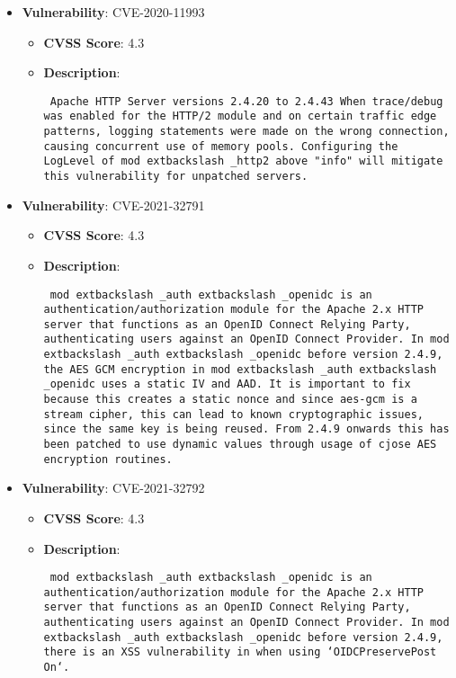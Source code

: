 \documentclass{article}
\begin{document}
\begin{itemize}
        \item \textbf{Vulnerability}: CVE-2020-11993
        \begin{itemize}
            \item \textbf{CVSS Score}:  4.3 
            \item \textbf{Description}: \parbox{\linewidth}{\texttt{ Apache HTTP Server versions 2.4.20 to 2.4.43 When trace/debug was enabled for the HTTP/2 module and on certain traffic edge patterns, logging statements were made on the wrong connection, causing concurrent use of memory pools. Configuring the LogLevel of mod	extbackslash _http2 above "info" will mitigate this vulnerability for unpatched servers. }}
        \end{itemize}
    
        \item \textbf{Vulnerability}: CVE-2021-32791
        \begin{itemize}
            \item \textbf{CVSS Score}:  4.3 
            \item \textbf{Description}: \parbox{\linewidth}{\texttt{ mod	extbackslash _auth	extbackslash _openidc is an authentication/authorization module for the Apache 2.x HTTP server that functions as an OpenID Connect Relying Party, authenticating users against an OpenID Connect Provider. In mod	extbackslash _auth	extbackslash _openidc before version 2.4.9, the AES GCM encryption in mod	extbackslash _auth	extbackslash _openidc uses a static IV and AAD. It is important to fix because this creates a static nonce and since aes-gcm is a stream cipher, this can lead to known cryptographic issues, since the same key is being reused. From 2.4.9 onwards this has been patched to use dynamic values through usage of cjose AES encryption routines. }}
        \end{itemize}
    
        \item \textbf{Vulnerability}: CVE-2021-32792
        \begin{itemize}
            \item \textbf{CVSS Score}:  4.3 
            \item \textbf{Description}: \parbox{\linewidth}{\texttt{ mod	extbackslash _auth	extbackslash _openidc is an authentication/authorization module for the Apache 2.x HTTP server that functions as an OpenID Connect Relying Party, authenticating users against an OpenID Connect Provider. In mod	extbackslash _auth	extbackslash _openidc before version 2.4.9, there is an XSS vulnerability in when using `OIDCPreservePost On`. }}
        \end{itemize}
    

\end{itemize}
\end{document}
